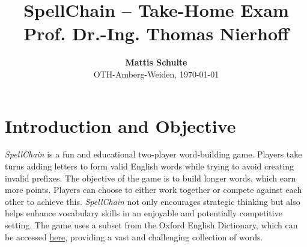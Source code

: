 \documentclass{article}
\begin{document}
\title{\textbf{SpellChain -- Take-Home Exam}\\ \vspace{0.2cm}\large \textbf{Prof. Dr.-Ing. Thomas Nierhoff}}
\author{\normalsize\textbf{Mattis Schulte}\\ {\small OTH-Amberg-Weiden, \today}}\date{}
\maketitle

\section*{Introduction and Objective}
\textit{SpellChain} is a fun and educational two-player word-building game. Players take turns adding letters to form valid English words while trying to avoid creating invalid prefixes. The objective of the game is to build longer words, which earn more points. Players can choose to either work together or compete against each other to achieve this. \textit{SpellChain} not only encourages strategic thinking but also helps enhance vocabulary skills in an enjoyable and potentially competitive setting. The game uses a subset from the Oxford English Dictionary, which can be accessed \href{https://raw.githubusercontent.com/sujithps/Dictionary/master/Oxford%20English%20Dictionary.txt}{\textcolor{links}{here}}, providing a vast and challenging collection of words.
\end{document}
